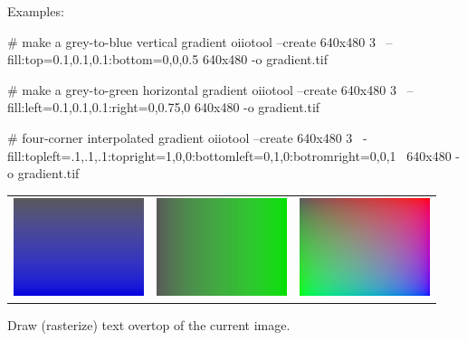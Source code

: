 \noindent Examples:

\begin{smallcode}
    # make a grey-to-blue vertical gradient
    oiiotool --create 640x480 3 \
        --fill:top=0.1,0.1,0.1:bottom=0,0,0.5 640x480 -o gradient.tif

    # make a grey-to-green horizontal gradient
    oiiotool --create 640x480 3 \
        --fill:left=0.1,0.1,0.1:right=0,0.75,0 640x480 -o gradient.tif
\end{smallcode}
\begin{tinycode}
    # four-corner interpolated gradient
    oiiotool --create 640x480 3 \
        -fill:topleft=.1,.1,.1:topright=1,0,0:bottomleft=0,1,0:botromright=0,0,1 \
            640x480 -o gradient.tif
\end{tinycode}
\noindent \begin{tabular}{lll}
\includegraphics[width=1.5in]{figures/gradient.jpg} &
 \includegraphics[width=1.5in]{figures/gradienth.jpg} &
 \includegraphics[width=1.5in]{figures/gradient4.jpg}
\end{tabular}

\apiend


Draw (rasterize) text overtop of the current image.

